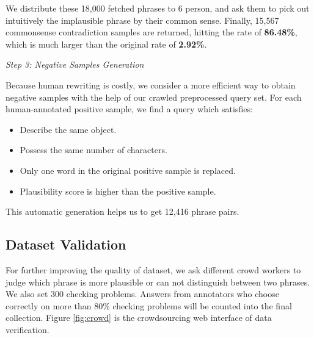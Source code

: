 We distribute these 18,000 fetched phrases %
to 6 person,%
and ask them to pick out intuitively the implausible phrase by their common sense. Finally, 15,567 commonsense contradiction samples are returned, hitting the rate of \textbf{86.48\%}, which is much larger than the original rate of \textbf{2.92\%}.

\textit{Step 3: Negative Samples Generation}

Because human rewriting is costly, we consider a more efficient way to obtain negative samples with the help of our crawled preprocessed query set.
For each human-annotated positive sample, we find a query which satisfies:
\begin{itemize}
	\item Describe the same object.
	\item Possess the same number of characters.
	\item Only one word in the original positive sample is replaced. %
	\item Plausibility score is higher than the positive sample.
\end{itemize}

This automatic generation helps us to get 12,416 phrase pairs.%

\subsection{Dataset Validation}
For further improving the quality of dataset, we ask different crowd workers to judge which phrase is more plausible or can not distinguish between two phrases. We also set 300 checking problems. %
Answers from annotators who choose correctly on more than 80\% checking problems will be counted into the final collection. Figure \ref{fig:crowd} is the crowdsourcing web interface of data verification.%

